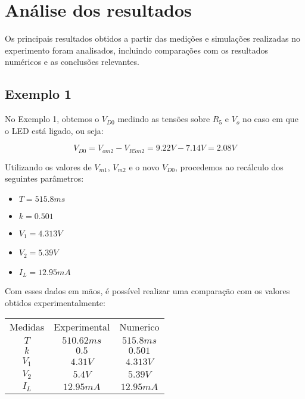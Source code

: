 \newpage

\section{Análise dos resultados}

Os principais resultados obtidos a partir das medições e simulações realizadas no experimento foram analisados, incluindo comparações com os resultados numéricos e as conclusões relevantes.

\subsection{Exemplo 1}

No Exemplo 1, obtemos o $V_{D0}$ medindo as tensões sobre $R_5$ e $V_o$ no caso em que o LED está ligado, ou seja:

\begin{equation}
    V_{D0} = V_{om2} - V_{R5m2} = 9.22V - 7.14V = 2.08V
\end{equation}

Utilizando os valores de $V_{m1}$, $V_{m2}$ e o novo $V_{D0}$, procedemos ao recálculo dos seguintes parâmetros:

\begin{itemize}
    \item $T = 515.8 ms$
    \item $k = 0.501$
    \item $V_1 = 4.313V$
    \item $V_2 = 5.39V$
    \item $I_L = 12.95mA$
\end{itemize}

Com esses dados em mãos, é possível realizar uma comparação com os valores obtidos experimentalmente:

\begin{center}
    \begin{tabular}{ |c|c|c| }
        \hline
        Medidas & Experimental & Numerico   \\
        $T$     & $510.62 ms$  & $515.8 ms$ \\
        $k$     & $0.5$        & $0.501$    \\
        $V_1$   & $4.31V$      & $4.313V$   \\
        $V_2$   & $5.4V$       & $5.39V$    \\
        $I_L$   & $12.95mA$    & $12.95mA$  \\
        \hline
    \end{tabular}
\end{center}

